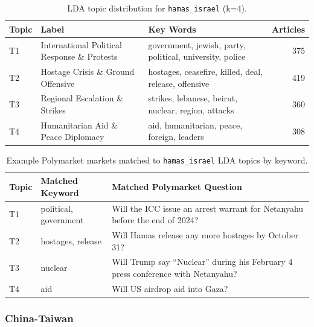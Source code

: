 \documentclass[11pt,a4paper]{article}
\begin{document}
\begin{table}[H]
\centering
\begin{tabular}{llp{6cm}r}
\hline
\textbf{Topic} & \textbf{Label} & \textbf{Key Words} & \textbf{Articles} \\
\hline
T1 & International Political Response \& Protests & government, jewish, party, political, university, police & 375 \\
T2 & Hostage Crisis \& Ground Offensive & hostages, ceasefire, killed, deal, release, offensive & 419 \\
T3 & Regional Escalation \& Strikes & strikes, lebanese, beirut, nuclear, region, attacks & 360 \\
T4 & Humanitarian Aid \& Peace Diplomacy & aid, humanitarian, peace, foreign, leaders & 308 \\
\hline
\end{tabular}
\caption{LDA topic distribution for \texttt{hamas\_israel} (k=4).}
\label{tab:lda_hamas_israel}
\end{table}

\begin{table}[H]
\centering
\begin{tabular}{p{2cm}p{4.8cm}p{9.5cm}}
\hline
\textbf{Topic} & \textbf{Matched Keyword} & \textbf{Matched Polymarket Question} \\
\hline
T1 & political, government & Will the ICC issue an arrest warrant for Netanyahu before the end of 2024? \\ %
T2 & hostages, release & Will Hamas release any more hostages by October 31? \\
T3 & nuclear & Will Trump say ``Nuclear'' during his February 4 press conference with Netanyahu? \\
T4 & aid & Will US airdrop aid into Gaza? \\
\hline
\end{tabular}
\caption{Example Polymarket markets matched to \texttt{hamas\_israel} LDA topics by keyword.}
\label{tab:polymarket_hamas_israel}
\end{table}

\subsubsection*{China-Taiwan}
\end{document}
